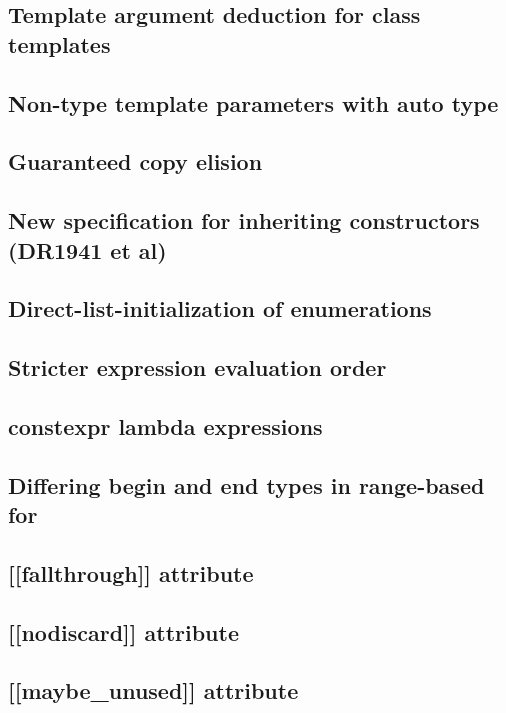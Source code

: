 \documentclass{book}
\begin{document}
\subsection{Template argument deduction for class templates}

\subsection{Non-type template parameters with auto type}

\subsection{Guaranteed copy elision}

\subsection{New specification for inheriting constructors (DR1941 et al)}

\subsection{Direct-list-initialization of enumerations}

\subsection{Stricter expression evaluation order}

\subsection{constexpr lambda expressions}

\subsection{Differing begin and end types in range-based for}

\subsection{[[fallthrough]] attribute}

\subsection{[[nodiscard]] attribute}

\subsection{[[maybe\_unused]] attribute}
\end{document}
